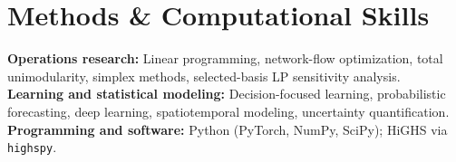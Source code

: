 \documentclass[10.6pt,letterpaper]{article}
\begin{document}
\section*{Methods \& Computational Skills}
\textbf{Operations research:} Linear programming, network-flow optimization, total unimodularity, simplex methods, selected-basis LP sensitivity analysis.\\[2pt]
\textbf{Learning and statistical modeling:} Decision-focused learning, probabilistic forecasting, deep learning, spatiotemporal modeling, uncertainty quantification.\\[2pt]
\textbf{Programming and software:} Python (PyTorch, NumPy, SciPy); HiGHS via \texttt{highspy}.
\end{document}
